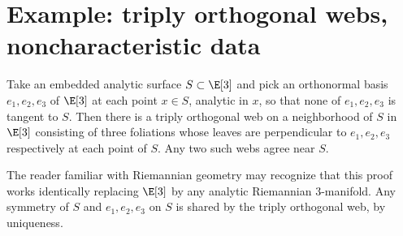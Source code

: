 \section{Example: triply orthogonal webs, noncharacteristic data}
\begin{theorem}
Take an embedded analytic surface \(S \subset \E[3]\) and pick an orthonormal basis \(e_1,e_2,e_3\) of \(\E[3]\) at each point \(x \in S\), analytic in \(x\), so that none of \(e_1,e_2,e_3\) is tangent to \(S\).
Then there is a triply orthogonal web on a neighborhood of \(S\) in \(\E[3]\) consisting of three foliations whose leaves are perpendicular to \(e_1,e_2,e_3\) respectively at each point of \(S\).
Any two such webs agree near \(S\).
\end{theorem}
The reader familiar with Riemannian geometry may recognize that this proof works identically replacing \(\E[3]\) by any analytic Riemannian \(3\)-manifold.
Any symmetry of \(S\) and \(e_1,e_2,e_3\) on \(S\) is shared by the triply orthogonal web, by uniqueness.
